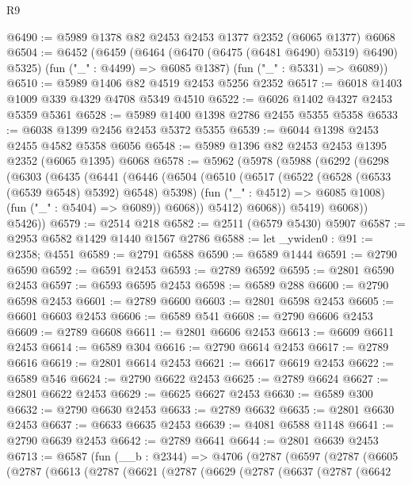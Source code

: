 \begin{lexlean}{R9}
\begin{coremodule}
@6490 := @5989 @1378 @82 @2453 @2453 @1377 @2352 (@6065 @1377) @6068
@6504 := @6452
    (@6459
      (@6464 (@6470 (@6475 (@6481 @6490) @5319) @6490) @5325)
      (fun ("_" : @4499) => @6085 @1387)
      (fun ("_" : @5331) => @6089))
@6510 := @5989 @1406 @82 @4519 @2453 @5256 @2352
@6517 := @6018 @1403 @1009 @339 @4329 @4708 @5349 @4510
@6522 := @6026 @1402 @4327 @2453 @5359 @5361
@6528 := @5989 @1400 @1398 @2786 @2455 @5355 @5358
@6533 := @6038 @1399 @2456 @2453 @5372 @5355
@6539 := @6044 @1398 @2453 @2455 @4582 @5358 @6056
@6548 := @5989 @1396 @82 @2453 @2453 @1395 @2352 (@6065 @1395) @6068
@6578 := @5962
    (@5978
      (@5988
        (@6292
          (@6298
            (@6303
              (@6435
                (@6441
                  (@6446
                    (@6504
                      (@6510
                        (@6517
                          (@6522 (@6528 (@6533 (@6539 @6548) @5392) @6548) @5398)
                          (fun ("_" : @4512) => @6085 @1008)
                          (fun ("_" : @5404) => @6089))
                        @6068))
                    @5412)
                  @6068))
              @5419)
            @6068))
        @5426))
@6579 := @2514 @218
@6582 := @2511 (@6579 @5430) @5907
@6587 := @2953 @6582 @1429 @1440 @1567 @2786
@6588 := let _ywiden0 : @91 := @2358; @4551
@6589 := @2791 @6588
@6590 := @6589 @1444
@6591 := @2790 @6590
@6592 := @6591 @2453
@6593 := @2789 @6592
@6595 := @2801 @6590 @2453
@6597 := @6593 @6595 @2453
@6598 := @6589 @288
@6600 := @2790 @6598 @2453
@6601 := @2789 @6600
@6603 := @2801 @6598 @2453
@6605 := @6601 @6603 @2453
@6606 := @6589 @541
@6608 := @2790 @6606 @2453
@6609 := @2789 @6608
@6611 := @2801 @6606 @2453
@6613 := @6609 @6611 @2453
@6614 := @6589 @304
@6616 := @2790 @6614 @2453
@6617 := @2789 @6616
@6619 := @2801 @6614 @2453
@6621 := @6617 @6619 @2453
@6622 := @6589 @546
@6624 := @2790 @6622 @2453
@6625 := @2789 @6624
@6627 := @2801 @6622 @2453
@6629 := @6625 @6627 @2453
@6630 := @6589 @300
@6632 := @2790 @6630 @2453
@6633 := @2789 @6632
@6635 := @2801 @6630 @2453
@6637 := @6633 @6635 @2453
@6639 := @4081 @6588 @1148
@6641 := @2790 @6639 @2453
@6642 := @2789 @6641
@6644 := @2801 @6639 @2453
@6713 := @6587
    (fun (__b : @2344) =>
    @4706
      (@2787
        (@6597
          (@2787
            (@6605
              (@2787
                (@6613
                  (@2787
                    (@6621
                      (@2787
                        (@6629
                          (@2787
                            (@6637
                              (@2787
                                (@6642

\end{coremodule}
\end{lexlean}
